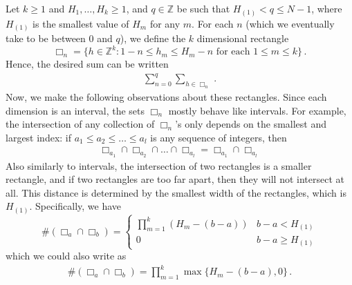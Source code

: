 \documentclass[11pt, oneside]{amsart}   	%
\newcommand{\1}{\mathbbm{1}}
\newcommand{\Z}{\mathbb{Z}}
\theoremstyle{definition}
\begin{document}
Let $k \geq 1$ and $H_1, \dots, H_k \geq 1$, and $q\in \mathbb{Z}$ be such that $H_{(1)} < q \leq N-1$, where $H_{(1)}$ is the smallest value of $H_m$ for any $m$. For each $n$ (which we eventually take to be between $0$ and $q$), we define the $k$ dimensional rectangle
$$\Box_n = \{ h\in \Z^{k} : 1 - n \leq h_m \leq H_m - n \text{ for each }1 \leq m \leq k\}\, .$$
Hence, the desired sum can be written
\begin{align*}
    \sum_{n=0}^q \sum_{h\in \Box_n} \, .
\end{align*}
Now, we make the following observations about these rectangles. Since each dimension is an interval, the sets $\Box_n$ mostly behave like intervals.
For example, the intersection of any collection of $\Box_n$'s only depends on the smallest and largest index: if $a_1 \leq a_2 \leq \dots \leq a_l$ is any sequence of integers, then
\begin{align}\label{O:int of rectangles}
\Box_{a_1} \cap \Box_{a_2} \cap \dots \cap \Box_{a_l} = \Box_{a_1}  \cap \Box_{a_l}
\end{align}
Also similarly to intervals, the intersection of two rectangles is a smaller rectangle, and if two rectangles are too far apart, then they will not intersect at all. This distance is determined by the smallest width of the rectangles, which is $H_{(1)}$. Specifically, we have
$$\#( \Box_a \cap \Box_b ) = \begin{cases} \prod_{m=1}^k (H_m - (b-a)) & b-a < H_{(1)} \\ 0 & b - a \geq H_{(1)} \end{cases}$$
which we could also write as
\begin{align}\label{O:box size}
\#( \Box_a \cap \Box_b ) = \prod_{m=1}^k \max\{H_m - (b - a), 0\} \, .
\end{align}
\end{document}
